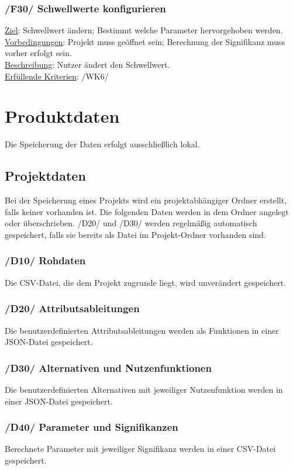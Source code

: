 \documentclass{article}
\begin{document}
\subsubsection*{/F30/ Schwellwerte konfigurieren}
\underline{Ziel}: Schwellwert ändern; Bestimmt welche Parameter hervorgehoben werden. \\
\underline{Vorbedingungen}: Projekt muss geöffnet sein; Berechnung der Signifikanz muss vorher erfolgt sein. \\
\underline{Beschreibung}: Nutzer ändert den Schwellwert.\\
\underline{Erfüllende Kriterien}: /WK6/

\clearpage
\section{Produktdaten}
Die Speicherung der Daten erfolgt ausschließlich lokal.
\subsection{Projektdaten}
Bei der Speicherung eines Projekts wird ein projektabhängiger Ordner erstellt, falls keiner vorhanden ist. Die folgenden Daten werden in dem Ordner angelegt oder überschrieben. \newline
/D20/ und /D30/ werden regelmäßig automatisch gespeichert, falls sie bereits als Datei im Projekt-Ordner vorhanden sind.
\subsubsection*{/D10/ Rohdaten}
Die CSV-Datei, die dem Projekt zugrunde liegt, wird unverändert gespeichert.
\subsubsection*{/D20/ Attributsableitungen}
Die benutzerdefinierten Attributsableitungen werden als Funktionen in einer JSON-Datei gespeichert.
\subsubsection*{/D30/ Alternativen und Nutzenfunktionen}
Die benutzerdefinierten Alternativen mit jeweiliger Nutzenfunktion werden in einer JSON-Datei gespeichert.
\subsubsection*{/D40/ Parameter und Signifikanzen}
Berechnete Parameter mit jeweiliger Signifikanz werden in einer CSV-Datei gespeichert.
\end{document}
